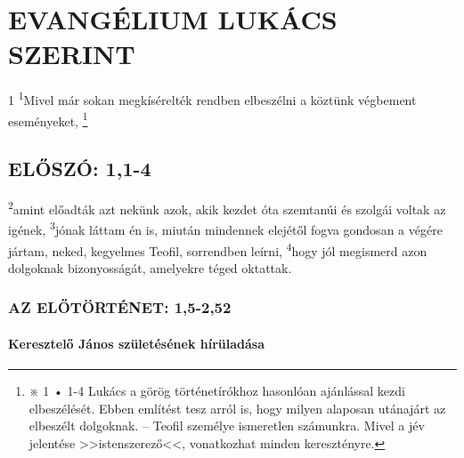 \documentclass[10pt]{article}
\begin{document}
\section*{EVANGÉLIUM LUKÁCS SZERINT}
\begin{multicols}{2}
 \lettrine{1}{} \textsuperscript{1}Mivel már sokan megkísérelték rendben elbeszélni a köztünk végbement eseményeket,
 \let\thefootnote\relax\footnote{※ 1 • 1-4 Lukács a görög történetírókhoz hasonlóan ajánlással kezdi elbeszélését. Ebben említést tesz arról is, hogy milyen alaposan utánajárt az elbeszélt dolgoknak.
  -- Teofil személye ismeretlen számunkra. Mivel a jév jelentése >>istenszerező<<, vonatkozhat minden keresztényre.}
 \subsection*{ELŐSZÓ: 1,1-4}
\textsuperscript{2}amint előadták azt nekünk azok, akik kezdet óta szemtanúi és szolgái voltak az igének,
\textsuperscript{3}jónak láttam én is, miután mindennek elejétől fogva gondosan a végére jártam, neked, kegyelmes Teofil, sorrendben leírni,
\textsuperscript{4}hogy jól megismerd azon dolgoknak bizonyosságát, amelyekre téged oktattak.

 \subsubsection*{AZ ELŐTÖRTÉNET: 1,5-2,52}
 \paragraph*{Keresztelő János születésének hírüladása}


\end{multicols}
\end{document}
